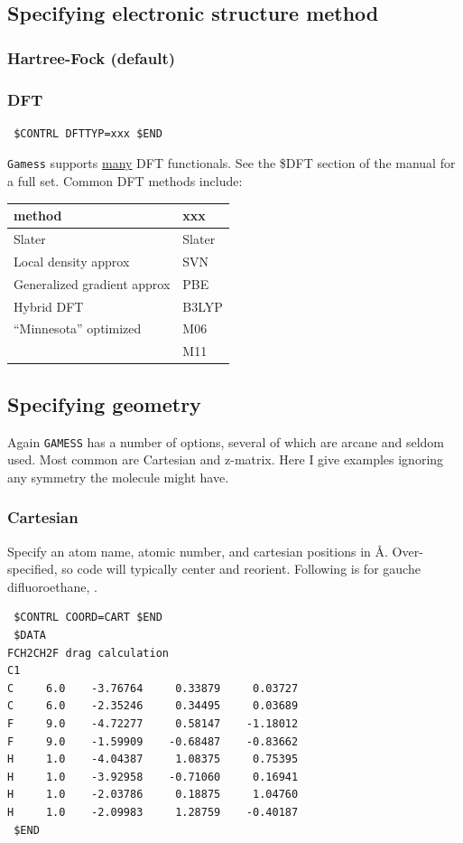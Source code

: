 \documentclass[11pt]{article}
\begin{document}
\subsection{Specifying electronic structure method}
\label{sec:org27d66b5}
\subsubsection{Hartree-Fock (default)}
\label{sec:org651fc65}
\subsubsection{DFT}
\label{sec:orge90cb39}
\begin{verbatim}
 $CONTRL DFTTYP=xxx $END
\end{verbatim}
\texttt{Gamess} supports \uline{many} DFT functionals.  See the \$DFT section of the manual for a full set.  Common DFT methods include:
\begin{center}
\begin{tabular}{ll}
\hline
method & xxx\\
\hline
Slater & Slater\\
Local density approx & SVN\\
Generalized gradient approx & PBE\\
Hybrid DFT & B3LYP\\
``Minnesota'' optimized & M06\\
 & M11\\
\hline
\end{tabular}
\end{center}

\subsection{Specifying geometry}
\label{sec:orgee446d3}
Again \texttt{GAMESS} has a number of options, several of which are arcane and seldom used.  Most common are Cartesian and z-matrix.  Here I give examples ignoring any symmetry the molecule might have.
\subsubsection{Cartesian}
\label{sec:orge49b2d1}
Specify an atom name, atomic number, and cartesian positions in \AA{}.  Over-specified, so code will typically center and reorient.  Following is for gauche difluoroethane, .
\begin{verbatim}
 $CONTRL COORD=CART $END
 $DATA
FCH2CH2F drag calculation
C1
C     6.0    -3.76764     0.33879     0.03727
C     6.0    -2.35246     0.34495     0.03689
F     9.0    -4.72277     0.58147    -1.18012
F     9.0    -1.59909    -0.68487    -0.83662
H     1.0    -4.04387     1.08375     0.75395
H     1.0    -3.92958    -0.71060     0.16941
H     1.0    -2.03786     0.18875     1.04760
H     1.0    -2.09983     1.28759    -0.40187
 $END
\end{verbatim}
\end{document}
